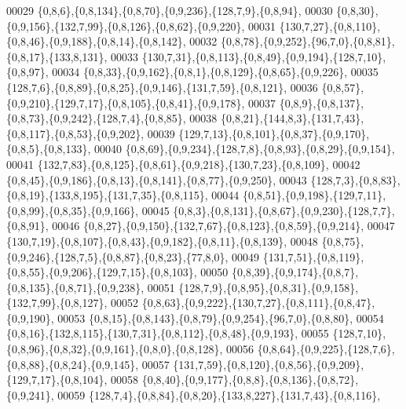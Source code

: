 \begin{DoxyCode}
00029         \{0,8,6\},\{0,8,134\},\{0,8,70\},\{0,9,236\},\{128,7,9\},\{0,8,94\},
00030         \{0,8,30\},\{0,9,156\},\{132,7,99\},\{0,8,126\},\{0,8,62\},\{0,9,220\},
00031         \{130,7,27\},\{0,8,110\},\{0,8,46\},\{0,9,188\},\{0,8,14\},\{0,8,142\},
00032         \{0,8,78\},\{0,9,252\},\{96,7,0\},\{0,8,81\},\{0,8,17\},\{133,8,131\},
00033         \{130,7,31\},\{0,8,113\},\{0,8,49\},\{0,9,194\},\{128,7,10\},\{0,8,97\},
00034         \{0,8,33\},\{0,9,162\},\{0,8,1\},\{0,8,129\},\{0,8,65\},\{0,9,226\},
00035         \{128,7,6\},\{0,8,89\},\{0,8,25\},\{0,9,146\},\{131,7,59\},\{0,8,121\},
00036         \{0,8,57\},\{0,9,210\},\{129,7,17\},\{0,8,105\},\{0,8,41\},\{0,9,178\},
00037         \{0,8,9\},\{0,8,137\},\{0,8,73\},\{0,9,242\},\{128,7,4\},\{0,8,85\},
00038         \{0,8,21\},\{144,8,3\},\{131,7,43\},\{0,8,117\},\{0,8,53\},\{0,9,202\},
00039         \{129,7,13\},\{0,8,101\},\{0,8,37\},\{0,9,170\},\{0,8,5\},\{0,8,133\},
00040         \{0,8,69\},\{0,9,234\},\{128,7,8\},\{0,8,93\},\{0,8,29\},\{0,9,154\},
00041         \{132,7,83\},\{0,8,125\},\{0,8,61\},\{0,9,218\},\{130,7,23\},\{0,8,109\},
00042         \{0,8,45\},\{0,9,186\},\{0,8,13\},\{0,8,141\},\{0,8,77\},\{0,9,250\},
00043         \{128,7,3\},\{0,8,83\},\{0,8,19\},\{133,8,195\},\{131,7,35\},\{0,8,115\},
00044         \{0,8,51\},\{0,9,198\},\{129,7,11\},\{0,8,99\},\{0,8,35\},\{0,9,166\},
00045         \{0,8,3\},\{0,8,131\},\{0,8,67\},\{0,9,230\},\{128,7,7\},\{0,8,91\},
00046         \{0,8,27\},\{0,9,150\},\{132,7,67\},\{0,8,123\},\{0,8,59\},\{0,9,214\},
00047         \{130,7,19\},\{0,8,107\},\{0,8,43\},\{0,9,182\},\{0,8,11\},\{0,8,139\},
00048         \{0,8,75\},\{0,9,246\},\{128,7,5\},\{0,8,87\},\{0,8,23\},\{77,8,0\},
00049         \{131,7,51\},\{0,8,119\},\{0,8,55\},\{0,9,206\},\{129,7,15\},\{0,8,103\},
00050         \{0,8,39\},\{0,9,174\},\{0,8,7\},\{0,8,135\},\{0,8,71\},\{0,9,238\},
00051         \{128,7,9\},\{0,8,95\},\{0,8,31\},\{0,9,158\},\{132,7,99\},\{0,8,127\},
00052         \{0,8,63\},\{0,9,222\},\{130,7,27\},\{0,8,111\},\{0,8,47\},\{0,9,190\},
00053         \{0,8,15\},\{0,8,143\},\{0,8,79\},\{0,9,254\},\{96,7,0\},\{0,8,80\},
00054         \{0,8,16\},\{132,8,115\},\{130,7,31\},\{0,8,112\},\{0,8,48\},\{0,9,193\},
00055         \{128,7,10\},\{0,8,96\},\{0,8,32\},\{0,9,161\},\{0,8,0\},\{0,8,128\},
00056         \{0,8,64\},\{0,9,225\},\{128,7,6\},\{0,8,88\},\{0,8,24\},\{0,9,145\},
00057         \{131,7,59\},\{0,8,120\},\{0,8,56\},\{0,9,209\},\{129,7,17\},\{0,8,104\},
00058         \{0,8,40\},\{0,9,177\},\{0,8,8\},\{0,8,136\},\{0,8,72\},\{0,9,241\},
00059         \{128,7,4\},\{0,8,84\},\{0,8,20\},\{133,8,227\},\{131,7,43\},\{0,8,116\},

\end{DoxyCode}
